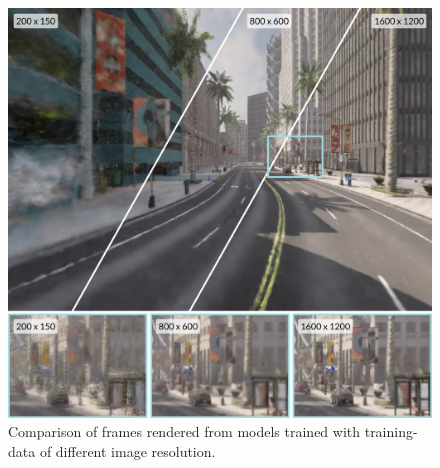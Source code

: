 \begin{figure}[h]
    \centering
    \includegraphics[width=1.0\textwidth]{figures/image-size-comparison-details.png}
    \caption{Comparison of frames rendered from models trained with training-data of different image resolution.}
    \label{fig:image-size-comparison}
\end{figure}